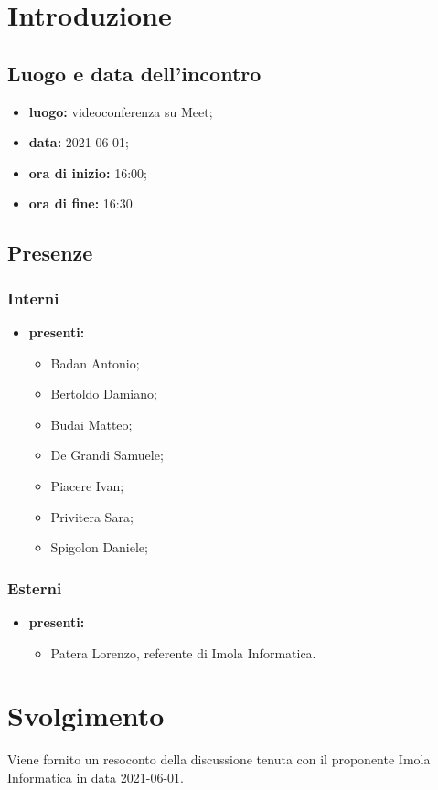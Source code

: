 \section*{Introduzione}
\subsection*{Luogo e data dell'incontro}
\begin{itemize}
	\item \textbf{luogo:} videoconferenza su Meet;
	\item \textbf{data:} 2021-06-01;
	\item \textbf{ora di inizio:} 16:00;
	\item \textbf{ora di fine:} 16:30.
\end{itemize}
\subsection*{Presenze}
\subsubsection*{Interni}
\begin{itemize}
	\item \textbf{presenti: }
	\begin{itemize}
		\item Badan Antonio;
		\item Bertoldo Damiano;
		\item Budai Matteo;
		\item De Grandi Samuele;
		\item Piacere Ivan;
		\item Privitera Sara;
		\item Spigolon Daniele;
	\end{itemize}
\end{itemize}
\subsubsection*{Esterni}
\begin{itemize}
	\item \textbf{presenti: }
	\begin{itemize}
		\item Patera Lorenzo, referente di Imola Informatica.
	\end{itemize}
\end{itemize}
\section{Svolgimento}
Viene fornito un resoconto della discussione tenuta con il proponente Imola Informatica in data 2021-06-01.

